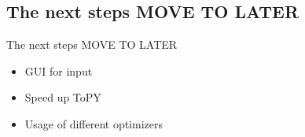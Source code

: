 
\subsection{The next steps MOVE TO LATER}
\begin{frame}{The next steps MOVE TO LATER}
\begin{itemize}
\item GUI for input
\item Speed up ToPY
\item Usage of different optimizers
\end{itemize}
\end{frame}